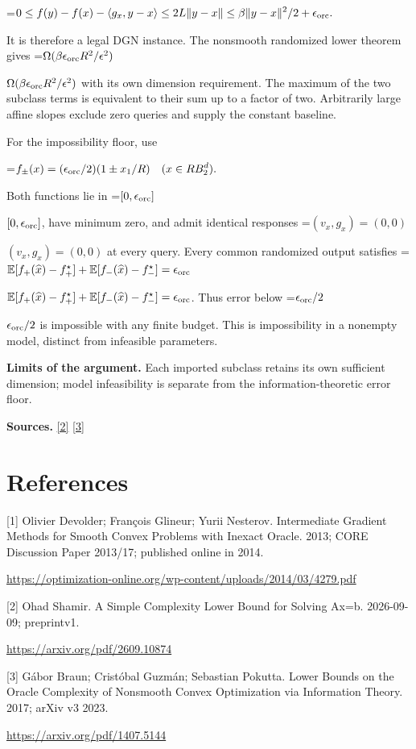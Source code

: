 \documentclass[10pt,a4paper]{article}
\newcommand{\AtlasMath}[1]{\par\begingroup\centering\setbox0=\hbox{$\displaystyle #1$}\ifdim\wd0>1.4\linewidth\typeout{ATLAS WIDE FORMULA: \the\wd0}\fi\ifdim\wd0>\linewidth\resizebox{\linewidth}{!}{\box0}\else\box0\fi\par\endgroup}
\newcommand{\AtlasInlineMath}[1]{\begingroup\setbox0=\hbox{$#1$}\ifdim\wd0>.4\linewidth\endgroup\AtlasMath{#1}\else\endgroup$#1$\fi}
\begin{document}
\AtlasMath{0\le f(y)-f(x)-\langle g_x,y-x\rangle
\le2L\|y-x\|
\le\beta\|y-x\|^2/2+\epsilon_{\rm orc}.}

It is therefore a legal DGN instance. The nonsmooth randomized lower theorem gives
\AtlasInlineMath{\Omega(\beta\epsilon_{\rm orc}R^2/\epsilon^2)}
with its own dimension requirement. The maximum of the two subclass terms is equivalent to their sum up to a factor of two. Arbitrarily large affine slopes exclude zero queries and supply the constant baseline.

For the impossibility floor, use

\AtlasMath{f_\pm(x)=(\epsilon_{\rm orc}/2)(1\pm x_1/R)
\quad(x\in RB_2^d).}

Both functions lie in \AtlasInlineMath{[0,\epsilon_{\rm orc}]}, have minimum zero, and admit identical responses \AtlasInlineMath{(v_x,g_x)=(0,0)} at every query. Every common randomized output satisfies
\AtlasInlineMath{\mathbb E[f_+(\widehat x)-f_+^\star]+\mathbb E[f_-(\widehat x)-f_-^\star]=\epsilon_{\rm orc}}.
Thus error below \AtlasInlineMath{\epsilon_{\rm orc}/2} is impossible with any finite budget. This is impossibility in a nonempty model, distinct from infeasible parameters.

\textbf{Limits of the argument.} Each imported subclass retains its own sufficient dimension; model infeasibility is separate from the information-theoretic error floor.

\textbf{Sources.} \href{https://arxiv.org/pdf/2609.10874}{[2]} \href{https://arxiv.org/pdf/1407.5144}{[3]}

\section{References}
[1] Olivier Devolder; François Glineur; Yurii Nesterov. Intermediate Gradient Methods for Smooth Convex Problems with Inexact Oracle. 2013; CORE Discussion Paper 2013/17; published online in 2014.

\url{https://optimization-online.org/wp-content/uploads/2014/03/4279.pdf}

[2] Ohad Shamir. A Simple Complexity Lower Bound for Solving Ax=b. 2026-09-09; preprintv1.

\url{https://arxiv.org/pdf/2609.10874}

[3] Gábor Braun; Cristóbal Guzmán; Sebastian Pokutta. Lower Bounds on the Oracle Complexity of Nonsmooth Convex Optimization via Information Theory. 2017; arXiv v3 2023.

\url{https://arxiv.org/pdf/1407.5144}
\end{document}
